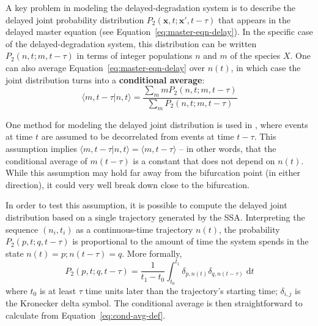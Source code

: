 \documentclass[english,letterpaper,12pt]{article}
\newcommand{\defkeywd}[1]{\textbf{#1}}
\newcommand{\dee}{\;\mathrm{d}}
\renewcommand{\vec}[1]{\ensuremath{\mathbf{#1}}}
\begin{document}
\begin{doublespacing}
A key problem in modeling the delayed-degradation system is to describe the delayed joint probability distribution $P_2(\vec{x}, t; \vec{x}', t - \tau)$ that appears in the delayed master equation (see Equation~\eqref{eq:master-eqn-delay}). In the specific case of the delayed-degradation system, this distribution can be written $P_2(n, t; m, t - \tau)$ in terms of integer populations $n$ and $m$ of the species $X$. One can also average Equation~\eqref{eq:master-eqn-delay} over $n(t)$, in which case the joint distribution turns into a \defkeywd{conditional average}:
\begin{equation}
    \langle m, t - \tau | n, t \rangle = \frac{\sum_m m P_2(n, t; m, t - \tau)}{\sum_m P_2(n, t; m, t - \tau) }
    \label{eq:cond-avg-def}
\end{equation}

One method for modeling the delayed joint distribution is used in \cite{delay-oscillations}, where events at time $t$ are assumed to be decorrelated from events at time $t - \tau$. This assumption implies $\langle m, t - \tau | n, t \rangle = \langle m, t - \tau \rangle$ -- in other words, that the conditional average of $m(t - \tau)$ is a constant that does not depend on $n(t)$. While this assumption may hold far away from the bifurcation point (in either direction), it could very well break down close to the bifurcation.

In order to test this assumption, it is possible to compute the delayed joint distribution based on a single trajectory generated by the SSA. Interpreting the sequence $(n_i, t_i)$ as a continuous-time trajectory $n(t)$, the probability $P_2(p, t; q, t - \tau)$ is proportional to the amount of time the system spends in the state $n(t) = p; n(t - \tau) = q$. More formally,
\begin{equation}
    P_2(p, t; q, t - \tau) = \frac{1}{t_1 - t_0} \int_{t_0}^{t_1} \delta_{p, n(t)} \delta_{q, n(t - \tau)} \dee t
    \label{eq:joint-pdist-calc}
\end{equation}
where $t_0$ is at least $\tau$ time units later than the trajectory's starting time; $\delta_{i,j}$ is the Kronecker delta symbol. The conditional average is then straightforward to calculate from Equation~\eqref{eq:cond-avg-def}.




\end{doublespacing}
\end{document}

